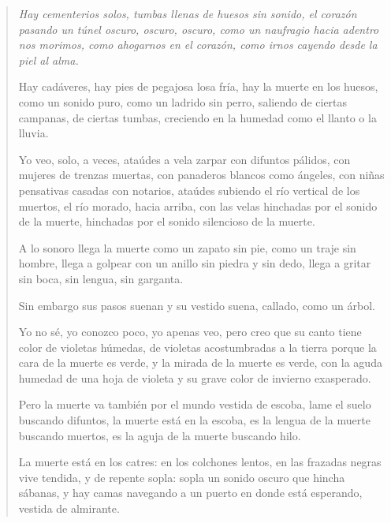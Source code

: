 \documentclass[12pt]{article}
\begin{document}
\clearpage
{}
\begin{verse}
\itshape
Hay cementerios solos,
tumbas llenas de huesos sin sonido,
el corazón pasando un túnel
oscuro, oscuro, oscuro,
como un naufragio hacia adentro nos morimos,
como ahogarnos en el corazón,
como irnos cayendo desde la piel al alma.

Hay cadáveres,
hay pies de pegajosa losa fría,
hay la muerte en los huesos,
como un sonido puro,
como un ladrido sin perro,
saliendo de ciertas campanas, de ciertas tumbas,
creciendo en la humedad como el llanto o la lluvia.

Yo veo, solo, a veces,
ataúdes a vela
zarpar con difuntos pálidos, con mujeres de trenzas muertas,
con panaderos blancos como ángeles,
con niñas pensativas casadas con notarios,
ataúdes subiendo el río vertical de los muertos,
el río morado,
hacia arriba, con las velas hinchadas por el sonido de la muerte,
hinchadas por el sonido silencioso de la muerte.

A lo sonoro llega la muerte
como un zapato sin pie, como un traje sin hombre,
llega a golpear con un anillo sin piedra y sin dedo,
llega a gritar sin boca, sin lengua, sin garganta.

Sin embargo sus pasos suenan
y su vestido suena, callado, como un árbol.

Yo no sé, yo conozco poco, yo apenas veo,
pero creo que su canto tiene color de violetas húmedas,
de violetas acostumbradas a la tierra
porque la cara de la muerte es verde,
y la mirada de la muerte es verde,
con la aguda humedad de una hoja de violeta
y su grave color de invierno exasperado.

Pero la muerte va también por el mundo vestida de escoba,
lame el suelo buscando difuntos,
la muerte está en la escoba,
es la lengua de la muerte buscando muertos,
es la aguja de la muerte buscando hilo.

La muerte está en los catres:
en los colchones lentos, en las frazadas negras
vive tendida, y de repente sopla:
sopla un sonido oscuro que hincha sábanas,
y hay camas navegando a un puerto
en donde está esperando, vestida de almirante.

\end{verse}
\end{document}
